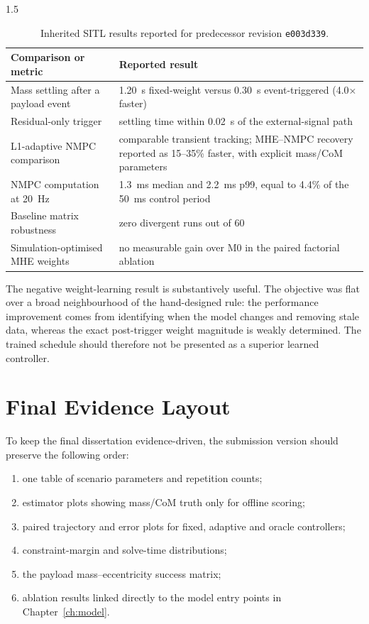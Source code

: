 \begin{spacing}{1.5}
\begin{table}[ht]
\centering
\caption{Inherited SITL results reported for predecessor revision \texttt{e003d339}.}
\label{tab:repo-results}
\begin{tabularx}{\textwidth}{@{}X X@{}}
\toprule
\textbf{Comparison or metric} & \textbf{Reported result} \\
\midrule
Mass settling after a payload event & \SI{1.20}{s} fixed-weight versus \SI{0.30}{s} event-triggered (4.0$\times$ faster) \\
Residual-only trigger & settling time within \SI{0.02}{s} of the external-signal path \\
L1-adaptive NMPC comparison & comparable transient tracking; MHE--NMPC recovery reported as 15--35\% faster, with explicit mass/CoM parameters \\
NMPC computation at \SI{20}{Hz} & \SI{1.3}{ms} median and \SI{2.2}{ms} p99, equal to 4.4\% of the \SI{50}{ms} control period \\
Baseline matrix robustness & zero divergent runs out of 60 \\
Simulation-optimised MHE weights & no measurable gain over M0 in the paired factorial ablation \\
\bottomrule
\end{tabularx}
\end{table}

The negative weight-learning result is substantively useful. The objective was flat over a broad neighbourhood of the hand-designed rule: the performance improvement comes from identifying when the model changes and removing stale data, whereas the exact post-trigger weight magnitude is weakly determined. The trained schedule should therefore not be presented as a superior learned controller.


\section{Final Evidence Layout}

To keep the final dissertation evidence-driven, the submission version should preserve the following order:
\begin{enumerate}
    \item one table of scenario parameters and repetition counts;
    \item estimator plots showing mass/CoM truth only for offline scoring;
    \item paired trajectory and error plots for fixed, adaptive and oracle controllers;
    \item constraint-margin and solve-time distributions;
    \item the payload mass--eccentricity success matrix;
    \item ablation results linked directly to the model entry points in Chapter~\ref{ch:model}.
\end{enumerate}


\end{spacing}

